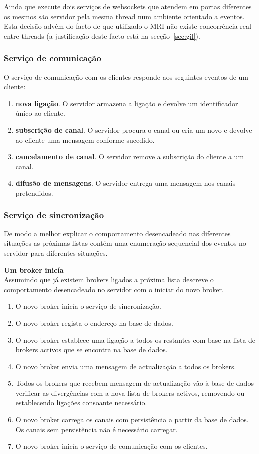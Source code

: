 Ainda que execute dois serviços de websockets que atendem em portas diferentes os mesmos são servidor pela mesma thread num ambiente orientado a eventos. Esta decisão advém do facto de que utilizado o MRI não existe concorrência real entre threads (a justificação deste facto está na secção~\ref{sec:gil}).

\subsubsection{Serviço de comunicação}

O serviço de comunicação com os clientes responde aos seguintes eventos de um cliente:

\begin{enumerate}
\item \textbf{nova ligação}. O servidor armazena a ligação e devolve um identificador único ao cliente.
\item \textbf{subscrição de canal}. O servidor procura o canal ou cria um novo e devolve ao cliente uma mensagem conforme sucedido.
\item \textbf{cancelamento de canal}. O servidor remove a subscrição do cliente a um canal.
\item \textbf{difusão de mensagens}. O servidor entrega uma mensagem nos canais pretendidos.
\end{enumerate}


\subsubsection{Serviço de sincronização}
De modo a melhor explicar o comportamento desencadeado nas diferentes situações as próximas listas contém uma enumeração sequencial dos eventos no servidor para diferentes situações.

\hl{}

\textbf{Um broker inicía}\\
Assumindo que já existem brokers ligados a próxima lista descreve o comportamento desencadeado no servidor com o iniciar do novo broker.

\begin{enumerate}
\item O novo broker inicía o serviço de sincronização.
\item O novo broker regista o endereço na base de dados.
\item O novo broker establece uma ligação a todos os restantes com base na lista de brokers activos que se encontra na base de dados.
\item O novo broker envia uma mensagem de actualização a todos os brokers.
\item Todos os brokers que recebem mensagem de actualização vão à base de dados verificar as divergências com a nova lista de brokers activos, removendo ou establecendo ligações consoante necessário.
\item O novo broker carrega os canais com persistência a partir da base de dados. Os canais sem persistência não é necessário carregar.
\item O novo broker inicía o serviço de comunicação com os clientes.
\end{enumerate}

